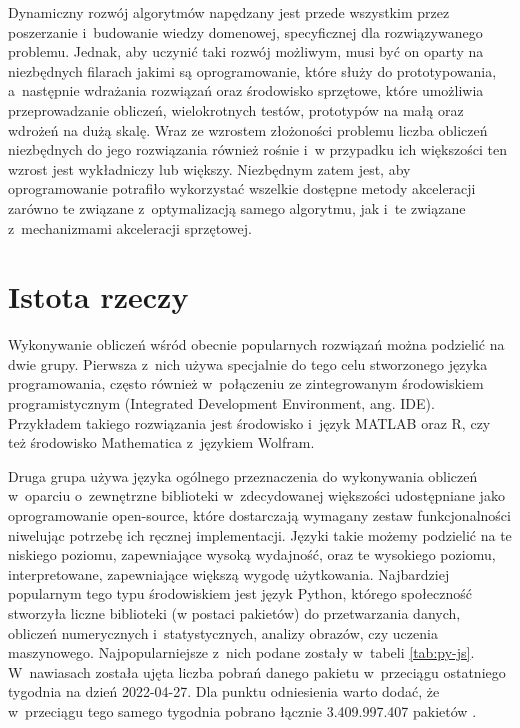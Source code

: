 Dynamiczny rozwój algorytmów napędzany jest przede wszystkim przez poszerzanie i~budowanie wiedzy domenowej, specyficznej dla rozwiązywanego problemu. Jednak, aby uczynić taki rozwój możliwym, musi być on oparty na niezbędnych filarach jakimi są oprogramowanie, które służy do prototypowania, a~następnie wdrażania rozwiązań oraz środowisko sprzętowe, które umożliwia przeprowadzanie obliczeń, wielokrotnych testów, prototypów na małą oraz wdrożeń na dużą skalę. Wraz ze wzrostem złożoności problemu liczba obliczeń niezbędnych do jego rozwiązania również rośnie i~w przypadku ich większości ten wzrost jest wykładniczy lub większy. Niezbędnym zatem jest, aby oprogramowanie potrafiło wykorzystać wszelkie dostępne metody akceleracji zarówno te związane z~optymalizacją samego algorytmu, jak i~te związane z~mechanizmami akceleracji sprzętowej.

\section{Istota rzeczy}

Wykonywanie obliczeń wśród obecnie popularnych rozwiązań można podzielić na dwie grupy. Pierwsza z~nich używa specjalnie do tego celu stworzonego języka programowania, często również w~połączeniu ze zintegrowanym środowiskiem programistycznym (Integrated Development Environment, ang. IDE). Przykładem takiego rozwiązania jest środowisko i~język MATLAB\cite{matlab} oraz R\cite{r}, czy też środowisko Mathematica z~językiem Wolfram\cite{mathematica}.

Druga grupa używa języka ogólnego przeznaczenia do wykonywania obliczeń w~oparciu o~zewnętrzne biblioteki w~zdecydowanej większości udostępniane jako oprogramowanie open-source, które dostarczają wymagany zestaw funkcjonalności niwelując potrzebę ich ręcznej implementacji. Języki takie możemy podzielić na te niskiego poziomu, zapewniające wysoką wydajność, oraz te wysokiego poziomu, interpretowane, zapewniające większą wygodę użytkowania. Najbardziej popularnym tego typu środowiskiem jest język Python, którego społeczność stworzyła liczne biblioteki (w postaci pakietów) do przetwarzania danych, obliczeń numerycznych i~statystycznych, analizy obrazów, czy uczenia maszynowego. Najpopularniejsze z~nich podane zostały w~tabeli \ref{tab:py-js}. W~nawiasach została ujęta liczba pobrań danego pakietu w~przeciągu ostatniego tygodnia na dzień 2022-04-27. Dla punktu odniesienia warto dodać, że w~przeciągu tego samego tygodnia pobrano łącznie 3.409.997.407 pakietów \cite{pypi-stats}.

